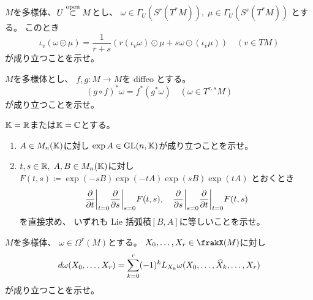\documentclass[report]{jlreq}
\begin{document}
\begin{problem}[幾何学III 問3.3.3]
    $M$を多様体、$U \stackrel{\text{open}}{\subset} M$とし、
    $\omega \in \Gamma_U(S^r(T^*M)), \; \mu \in \Gamma_U(S^s(T^*M))$
    とする。
    このとき
    \begin{equation}
        \iota_v (\omega \odot \mu)
            = \frac{1}{r + s}
            (r (\iota_v \omega) \odot \mu + s \omega \odot (\iota_v \mu))
            \quad
            (v \in TM)
    \end{equation}
    が成り立つことを示せ。
\end{problem}

\begin{answer}
    \TODO{}
\end{answer}

\begin{problem}[幾何学III 問3.4.1]
    $M$を多様体とし、
    $f, g \colon M \to M$を diffeo とする。
    \begin{equation}
        (g \circ f)^* \omega = f^* (g^* \omega)
        \quad
        (\omega \in T^{r, s}M)
    \end{equation}
    が成り立つことを示せ。
\end{problem}

\begin{answer}
    \TODO{}
\end{answer}

\begin{problem}[幾何学III 問3.4.8]
    $\mathbb{K} = \mathbb{R}$または$\mathbb{K} = \mathbb{C}$とする。
    \begin{enumerate}
        \item $A \in M_n(\mathbb{K})$に対し
            $\exp A \in \operatorname{\mathrm{GL}}(n, \mathbb{K})$が成り立つことを示せ。
        \item $t, s \in \mathbb{R}, \; A, B \in M_n(\mathbb{K})$に対し
            $F(t, s) \coloneqq \exp(-sB) \exp(-tA) \exp(sB) \exp(tA)$
            とおくとき
            \begin{equation}
                \deldel{t}\bigg|_{t = 0} \deldel{s}\bigg|_{s = 0} F(t, s),
                \quad
                \deldel{s}\bigg|_{s = 0} \deldel{t}\bigg|_{t = 0} F(t, s)
            \end{equation}
            を直接求め、
            いずれも Lie 括弧積$[B, A]$に等しいことを示せ。
    \end{enumerate}
\end{problem}

\begin{answer}
    \TODO{}
\end{answer}

\begin{problem}[幾何学III 問3.4.10]
    $M$を多様体、
    $\omega \in \Omega^r(M)$とする。
    $X_0, \dots, X_r \in \frakX(M)$に対し
    \begin{equation}
        d\omega(X_0, \dots, X_r)
            = \sum_{k = 0}^r (-1)^k
            L_{X_k} \omega(X_0, \dots, \widehat{X}_k, \dots, X_r)
    \end{equation}
    が成り立つことを示せ。
\end{problem}

\begin{answer}
    \TODO{}
\end{answer}
\end{document}
